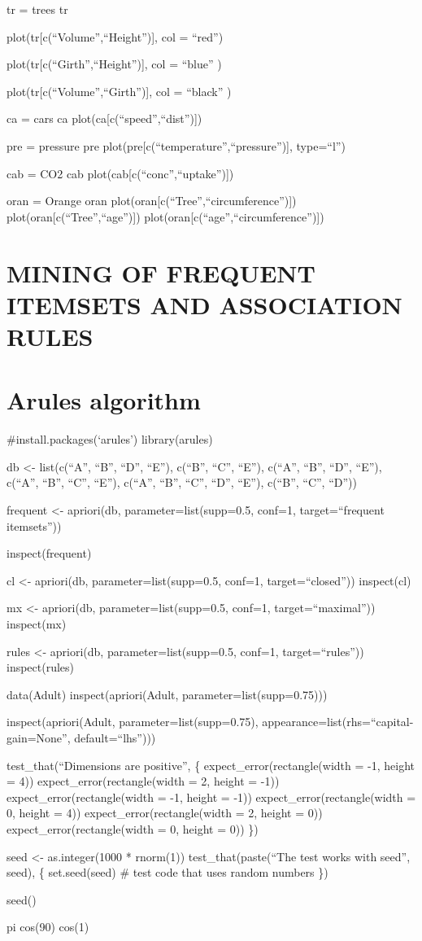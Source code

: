 \documentclass[
]{article}
\begin{document}
tr = trees tr

plot(tr{[}c(``Volume'',``Height''){]}, col = ``red'')

plot(tr{[}c(``Girth'',``Height''){]}, col = ``blue'' )

plot(tr{[}c(``Volume'',``Girth''){]}, col = ``black'' )

ca = cars ca plot(ca{[}c(``speed'',``dist''){]})

pre = pressure pre plot(pre{[}c(``temperature'',``pressure''){]},
type=``l'')

cab = CO2 cab plot(cab{[}c(``conc'',``uptake''){]})

oran = Orange oran plot(oran{[}c(``Tree'',``circumference''){]})
plot(oran{[}c(``Tree'',``age''){]})
plot(oran{[}c(``age'',``circumference''){]})

\section{MINING OF FREQUENT ITEMSETS AND ASSOCIATION
RULES}\label{mining-of-frequent-itemsets-and-association-rules}

\section{Arules algorithm}\label{arules-algorithm}

\#install.packages(`arules') library(arules)

db \textless- list(c(``A'', ``B'', ``D'', ``E''), c(``B'', ``C'',
``E''), c(``A'', ``B'', ``D'', ``E''), c(``A'', ``B'', ``C'', ``E''),
c(``A'', ``B'', ``C'', ``D'', ``E''), c(``B'', ``C'', ``D''))

frequent \textless- apriori(db, parameter=list(supp=0.5, conf=1,
target=``frequent itemsets''))

inspect(frequent)

cl \textless- apriori(db, parameter=list(supp=0.5, conf=1,
target=``closed'')) inspect(cl)

mx \textless- apriori(db, parameter=list(supp=0.5, conf=1,
target=``maximal'')) inspect(mx)

rules \textless- apriori(db, parameter=list(supp=0.5, conf=1,
target=``rules'')) inspect(rules)

data(Adult) inspect(apriori(Adult, parameter=list(supp=0.75)))

inspect(apriori(Adult, parameter=list(supp=0.75),
appearance=list(rhs=``capital-gain=None'', default=``lhs'')))

test\_that(``Dimensions are positive'', \{ expect\_error(rectangle(width
= -1, height = 4)) expect\_error(rectangle(width = 2, height = -1))
expect\_error(rectangle(width = -1, height = -1))
expect\_error(rectangle(width = 0, height = 4))
expect\_error(rectangle(width = 2, height = 0))
expect\_error(rectangle(width = 0, height = 0)) \})

seed \textless- as.integer(1000 * rnorm(1)) test\_that(paste(``The test
works with seed'', seed), \{ set.seed(seed) \# test code that uses
random numbers \})

seed()

pi cos(90) cos(1)
\end{document}
